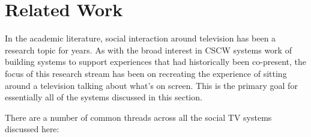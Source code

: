 % 
%



\section{Related Work}

In the academic literature, social interaction around television has been a research topic for years. As with the broad interest in CSCW systems work of building systems to support experiences that had historically been co-present, the focus of this research stream has been on recreating the experience of sitting around a television talking about what's on screen. This is the primary goal for essentially all of the systems discussed in this section. 

There are a number of common threads across all the social TV systems discussed here:

